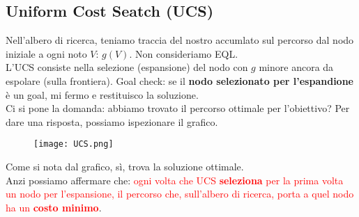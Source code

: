 \documentclass{article}
\begin{document}
\subsection{Uniform Cost Seatch (UCS)}
Nell'albero di ricerca, teniamo traccia del nostro accumlato sul percorso dal nodo iniziale a ogni noto $V$: $g(V)$. Non consideriamo EQL. \\
L'UCS consiste nella selezione (espansione) del nodo con $g$ minore ancora da espolare (sulla frontiera). Goal check: se il \textbf{nodo selezionato per l'espandione} è un goal, mi fermo e restituisco la soluzione. \\
Ci si pone la domanda: abbiamo trovato il percorso ottimale per l'obiettivo? Per dare una risposta, possiamo ispezionare il grafico.
\begin{figure}[H]
    \centering
    \texttt{[image: UCS.png]}
\end{figure}
Come si nota dal grafico, sì, trova la soluzione ottimale.
\\
Anzi possiamo affermare che: \textcolor{red}{ogni volta che UCS \textbf{seleziona} per la prima volta un nodo per l'espansione, il percorso che, sull'albero di ricerca, porta a quel nodo ha un \textbf{costo minimo}}. 
\end{document}
